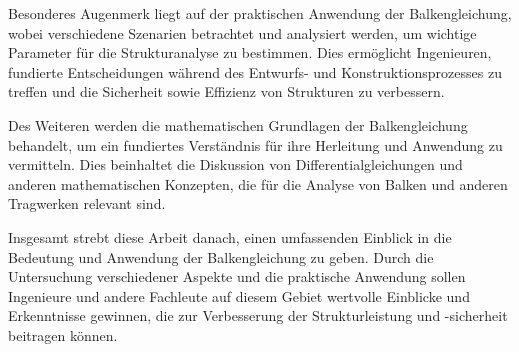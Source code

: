 Besonderes Augenmerk liegt auf der praktischen Anwendung der Balkengleichung, wobei verschiedene Szenarien betrachtet und analysiert werden, um wichtige Parameter für die Strukturanalyse zu bestimmen. Dies ermöglicht Ingenieuren, fundierte Entscheidungen während des Entwurfs- und Konstruktionsprozesses zu treffen und die Sicherheit sowie Effizienz von Strukturen zu verbessern.

Des Weiteren werden die mathematischen Grundlagen der Balkengleichung behandelt, um ein fundiertes Verständnis für ihre Herleitung und Anwendung zu vermitteln. Dies beinhaltet die Diskussion von Differentialgleichungen und anderen mathematischen Konzepten, die für die Analyse von Balken und anderen Tragwerken relevant sind.

Insgesamt strebt diese Arbeit danach, einen umfassenden Einblick in die Bedeutung und Anwendung der Balkengleichung zu geben. Durch die Untersuchung verschiedener Aspekte und die praktische Anwendung sollen Ingenieure und andere Fachleute auf diesem Gebiet wertvolle Einblicke und Erkenntnisse gewinnen, die zur Verbesserung der Strukturleistung und -sicherheit beitragen können.

